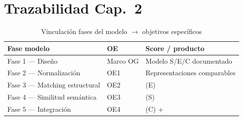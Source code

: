 \small

\normalsize

\section{Trazabilidad Cap.~2}

\begin{table}[H]
  \centering
  \caption{Vinculación fases del modelo $\rightarrow$ objetivos específicos}
  \label{tab:anexo-c-trazabilidad}
  \small
  \begin{tabular}{@{}lll@{}}
    \toprule
    \textbf{Fase modelo} & \textbf{OE} & \textbf{Score / producto} \\
    \midrule
    Fase 1 — Diseño & Marco OG & Modelo S/E/C documentado \\
    Fase 2 — Normalización & OE1 & Representaciones comparables \\
    Fase 3 — Matching estructural & OE2 & \StructuralScore{} (E) \\
    Fase 4 — Similitud semántica & OE3 & \SemanticScore{} (S) \\
    Fase 5 — Integración & OE4 & \CoverageScore{} (C) + \AlignmentScore{} \\
    \bottomrule
  \end{tabular}
\end{table}
